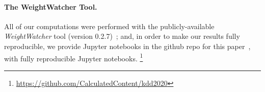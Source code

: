 \paragraph{The WeightWatcher Tool.}

All of our computations were performed with the publicly-available \emph{WeightWatcher} tool (version 0.2.7)~\cite{weightwatcher_package};
and, in order to make our results fully reproducible, we provide Jupyter notebooks in the github repo for this paper~\cite{repo},
with fully reproducible Jupyter notebooks.%
\footnote{\url{https://github.com/CalculatedContent/kdd2020} }


